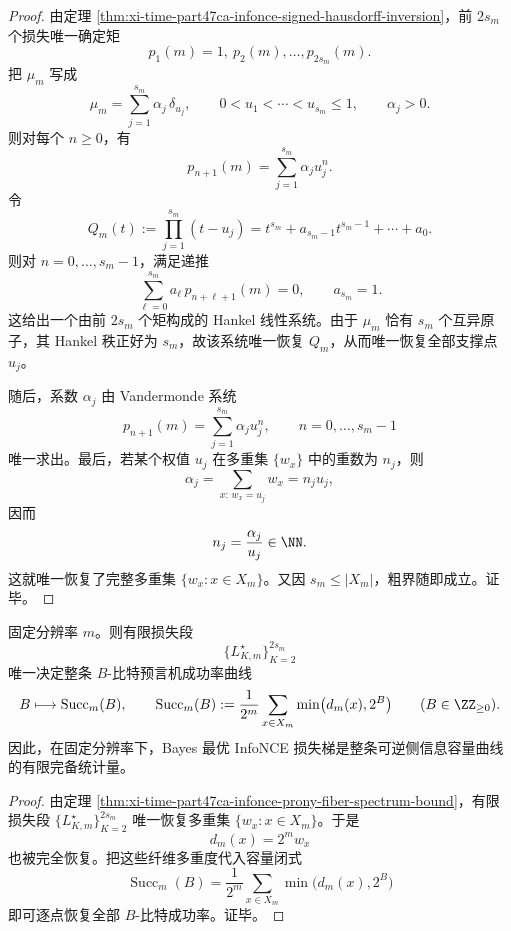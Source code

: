 \begin{proof}
由定理 \ref{thm:xi-time-part47ca-infonce-signed-hausdorff-inversion}，前 \(2s_m\) 个损失唯一确定矩
\[
p_1(m)=1,\ p_2(m),\dots,p_{2s_m}(m).
\]
把 \(\mu_m\) 写成
\[
\mu_m=\sum_{j=1}^{s_m}\alpha_j\,\delta_{u_j},
\qquad
0<u_1<\cdots<u_{s_m}\le 1,
\qquad
\alpha_j>0.
\]
则对每个 \(n\ge 0\)，有
\[
p_{n+1}(m)=\sum_{j=1}^{s_m}\alpha_j u_j^n.
\]
令
\[
Q_m(t):=\prod_{j=1}^{s_m}(t-u_j)
=
t^{s_m}+a_{s_m-1}t^{s_m-1}+\cdots+a_0.
\]
则对 \(n=0,\dots,s_m-1\)，满足递推
\[
\sum_{\ell=0}^{s_m}a_\ell\,p_{n+\ell+1}(m)=0,
\qquad
a_{s_m}=1.
\]
这给出一个由前 \(2s_m\) 个矩构成的 Hankel 线性系统。由于 \(\mu_m\) 恰有 \(s_m\) 个互异原子，其 Hankel 秩正好为 \(s_m\)，故该系统唯一恢复 \(Q_m\)，从而唯一恢复全部支撑点 \(u_j\)。

随后，系数 \(\alpha_j\) 由 Vandermonde 系统
\[
p_{n+1}(m)=\sum_{j=1}^{s_m}\alpha_j u_j^n,
\qquad
n=0,\dots,s_m-1
\]
唯一求出。最后，若某个权值 \(u_j\) 在多重集 \(\{w_x\}\) 中的重数为 \(n_j\)，则
\[
\alpha_j=\sum_{x:\,w_x=u_j}w_x=n_j u_j,
\]
因而
\[
n_j=\frac{\alpha_j}{u_j}\in\NN.
\]
这就唯一恢复了完整多重集 \(\{w_x:x\in X_m\}\)。又因 \(s_m\le |X_m|\)，粗界随即成立。证毕。
\end{proof}

\begin{corollary}\label{cor:xi-time-part47ca-infonce-finite-loss-capacity-complete}
固定分辨率 \(m\)。则有限损失段
\[
\{L_{K,m}^{\star}\}_{K=2}^{2s_m}
\]
唯一决定整条 \(B\)-比特预言机成功率曲线
\[
B\longmapsto \operatorname{Succ}_m(B),
\qquad
\operatorname{Succ}_m(B)
:=
\frac{1}{2^m}\sum_{x\in X_m}\min\bigl(d_m(x),2^B\bigr)
\qquad(B\in\ZZ_{\ge 0}).
\]
因此，在固定分辨率下，Bayes 最优 InfoNCE 损失梯是整条可逆侧信息容量曲线的有限完备统计量。
\end{corollary}

\begin{proof}
由定理 \ref{thm:xi-time-part47ca-infonce-prony-fiber-spectrum-bound}，有限损失段 \(\{L_{K,m}^{\star}\}_{K=2}^{2s_m}\) 唯一恢复多重集 \(\{w_x:x\in X_m\}\)。于是
\[
d_m(x)=2^m w_x
\]
也被完全恢复。把这些纤维多重度代入容量闭式
\[
\operatorname{Succ}_m(B)
=
\frac{1}{2^m}\sum_{x\in X_m}\min\bigl(d_m(x),2^B\bigr)
\]
即可逐点恢复全部 \(B\)-比特成功率。证毕。
\end{proof}

